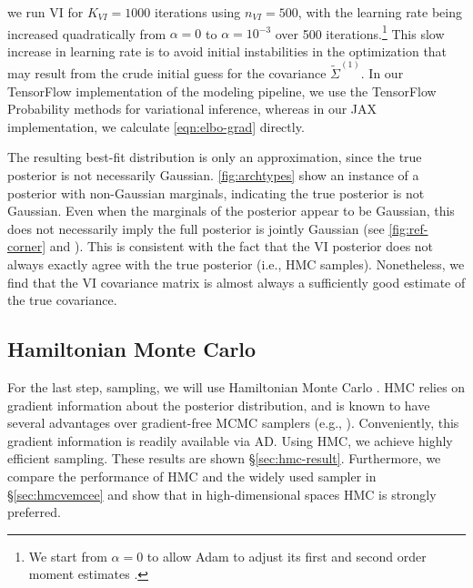  we run VI for $K_{VI}=1000$ iterations using $n_{VI}=500$, with the learning rate being increased quadratically from $\alpha=0$ to $\alpha=10^{-3}$ over 500 iterations.\footnote{We start from $\alpha=0$ to allow Adam to adjust its first and second order moment estimates .} This slow increase in learning rate is to avoid initial instabilities in the optimization that may result from the crude initial guess for the covariance $\tilde{\Sigma}^{(1)}$. In our TensorFlow implementation of the modeling pipeline, we use the TensorFlow Probability methods for variational inference, whereas in our JAX implementation, we calculate \cref{eqn:elbo-grad} directly.

The resulting best-fit distribution is only an approximation, since the true posterior is not necessarily Gaussian. \cref{fig:archtypes} show an instance of a posterior with non-Gaussian marginals, indicating the true posterior is not Gaussian. Even when the marginals of the posterior appear to be Gaussian, this does not necessarily imply the full posterior is jointly Gaussian (see \cref{fig:ref-corner} and \citet{dutta2014b}). This is consistent with the fact that the VI posterior does not always exactly agree with the true posterior (i.e., HMC samples). Nonetheless, we find that the VI covariance matrix is almost always a sufficiently good estimate of the true covariance. 


\clearpage
\subsection{Hamiltonian Monte Carlo}\label{sec:hmc}
For the last step, sampling, we will use Hamiltonian Monte Carlo \citep[HMC;][]{duan1987a, neal2012a}. 
HMC relies on gradient information about the posterior distribution, and is known to have several advantages over gradient-free MCMC samplers (e.g., \emcee). 
Conveniently, this gradient information is readily available via AD. 
Using HMC, we achieve highly efficient sampling.
These results are shown \S\ref{sec:hmc-result}. 
Furthermore, we compare the performance of HMC and the widely used \emcee sampler in \S\ref{sec:hmcvemcee} and show that in high-dimensional spaces HMC is strongly preferred.

